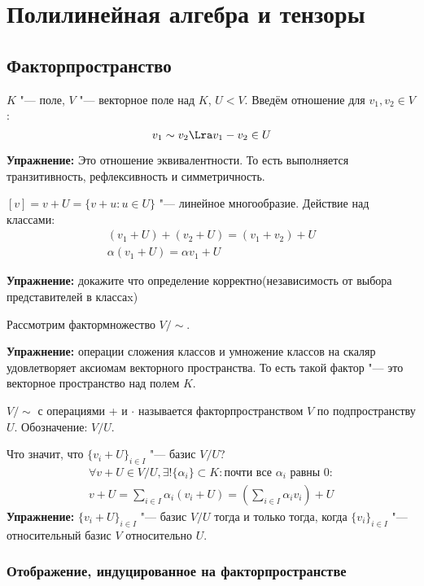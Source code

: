 ﻿\chapter{Полилинейная алгебра и тензоры}

\section{Факторпространство}

\begin{Def}
	$K$ "--- поле, $V$ "--- векторное поле над $K$, $U < V$.
	Введём отношение для $v_1, v_2 \in V$:
	\[ v_1 \sim v_2 \Lra v_1 - v_2 \in U \]
\end{Def}
\textbf{Упражнение:} Это отношение эквивалентности. То есть выполняется транзитивность, рефлексивность и симметричность.

\begin{Def}
	$[v] = v + U = \{v + u\colon u \in U\}$ "--- линейное многообразие.
	Действие над классами:
	\begin{gather*}
		(v_1 + U) + (v_2 + U) = (v_1 + v_2) + U \\
		\alpha(v_1 + U) = \alpha v_1 + U
	\end{gather*}
\end{Def}
\textbf{Упражнение:} докажите что определение корректно(независимость от выбора представителей в классаx)

Рассмотрим фактормножество $V/\sim$.

\textbf{Упражнение:} операции сложения классов и умножение классов на скаляр удовлетворяет аксиомам векторного пространства. То есть
такой фактор "--- это векторное пространство над полем $K$.

\begin{Def}
	$V/\sim$ с операциями + и $\cdot$ называется факторпространством $V$ по подпространству $U$.
	Обозначение: $V/U$.
\end{Def}
Что значит, что $\{v_i + U\}_{i \in I}$ "--- базис $V/U$?
\begin{gather*}
	\forall v + U \in V/U, \exists! \{\alpha_i\} \subset K\colon \text{почти все $\alpha_i$ равны 0}\colon \\
	v + U = \sum_{i \in I}\alpha_i(v_i + U) = \left(\sum_{i \in I}\alpha_i v_i\right) + U
\end{gather*}
\textbf{Упражнение:}
$\{v_i + U\}_{i \in I}$  "--- базис $V/U$ тогда и только тогда, когда
$\{v_i\}_{i \in I}$ "--- относительный базис $V$ относительно $U$.

\subsection{Отображение, индуцированное на факторпространстве}

